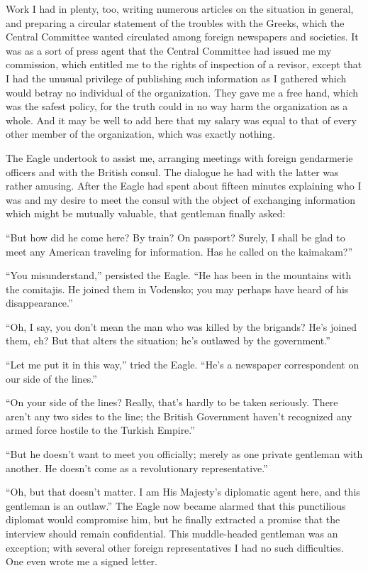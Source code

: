 \documentclass[a5paper,12pt]{book}
\begin{document}
Work I had in plenty, too, writing numerous articles on the situation in general, and preparing a circular statement of the troubles with the Greeks, which the Central Committee wanted circulated among foreign newspapers and societies. It was as a sort of press agent that the Central Committee had issued me my commission, which entitled me to the rights of inspection of a revisor, except that I had the unusual privilege of publishing such information as I gathered which would betray no individual of the organization. They gave me a free hand, which was the safest policy, for the truth could in no way harm the organization as a whole. And it may be well to add here that my salary was equal to that of every other member of the organization, which was exactly nothing.

The Eagle undertook to assist me, arranging meetings with foreign gendarmerie officers and with the British consul. The dialogue he had with the latter was rather amusing. After the Eagle had spent about fifteen minutes explaining who I was and my desire to meet the consul with the object of exchanging information which might be mutually valuable, that gentleman finally asked:

“But how did he come here? By train? On passport? Surely, I shall be glad to meet any American traveling for information. Has he called on the kaimakam?”

“You misunderstand,” persisted the Eagle. “He has been in the mountains with the comitajis. He joined them in Vodensko; you may perhaps have heard of his disappearance.”

“Oh, I say, you don’t mean the man who was killed by the brigands? He’s joined them, eh? But that alters the situation; he’s outlawed by the government.”

“Let me put it in this way,” tried the Eagle. “He’s a newspaper correspondent on our side of the lines.”

“On your side of the lines? Really, that’s hardly to be taken seriously. There aren’t any two sides to the line; the British Government haven’t recognized any armed force hostile to the Turkish Empire.”

“But he doesn’t want to meet you officially; merely as one private gentleman with another. He doesn’t come as a revolutionary representative.”

“Oh, but that doesn’t matter. I am His Majesty’s diplomatic agent here, and this gentleman is an outlaw.” The Eagle now became alarmed that this punctilious diplomat would compromise him, but he finally extracted a promise that the interview should remain confidential. This muddle-headed gentleman was an exception; with several other foreign representatives I had no such difficulties. One even wrote me a signed letter.
\end{document}
